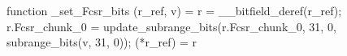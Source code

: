 function _set_Fcsr_bits (r_ref, v) = {
    r = __bitfield_deref(r_ref);
    r.Fcsr_chunk_0 = update_subrange_bits(r.Fcsr_chunk_0, 31, 0, subrange_bits(v, 31, 0));
    (*r_ref) = r
}
